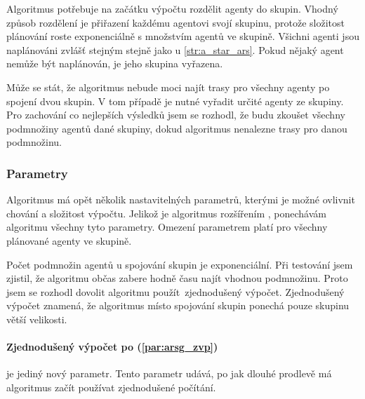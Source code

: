Algoritmus potřebuje na začátku výpočtu rozdělit agenty do skupin.
Vhodný způsob rozdělení je přiřazení každému agentovi svojí skupinu,
protože složitost plánování roste exponenciálně s množstvím agentů ve skupině.
Všichni agenti jsou naplánováni zvlášť stejným stejně jako u \ref{str:a_star_ars}.
Pokud nějaký agent nemůže být naplánován, je jeho skupina vyřazena.

Může se stát, že algoritmus nebude moci najít trasy pro všechny agenty po spojení dvou skupin.
V tom případě je nutné vyřadit určité agenty ze skupiny.
Pro zachování co nejlepších výsledků jsem se rozhodl, že budu zkoušet všechny podmnožiny agentů dané skupiny,
dokud algoritmus nenalezne trasy pro danou podmnožinu.

\subsubsection{Parametry}\label{subsubsec:arsg_parametry}
Algoritmus má opět několik nastavitelných parametrů, kterými je možné ovlivnit chování a složitost výpočtu.
Jelikož je algoritmus rozšířením , ponechávám algoritmu všechny tyto parametry.
Omezení parametrem platí pro všechny plánované agenty ve skupině.

Počet podmnožin agentů u spojování skupin je exponenciální.
Při testování jsem zjistil, že algoritmu občas zabere hodně času najít vhodnou podmnožinu.
Proto jsem se rozhodl dovolit algoritmu použít\ zjednodušený výpočet.
Zjednodušený výpočet znamená, že algoritmus místo spojování skupin ponechá pouze skupinu větší velikosti.

\paragraph{Zjednodušený výpočet po (\ref{par:arsg_zvp})} je jediný nový parametr.
Tento parametr udává, po jak dlouhé prodlevě má algoritmus začít používat zjednodušené počítání.

